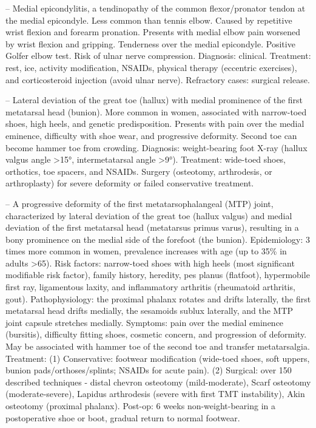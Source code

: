 -- Medial epicondylitis, a tendinopathy of the common flexor/pronator tendon at the medial epicondyle. Less common than tennis elbow. Caused by repetitive wrist flexion and forearm pronation. Presents with medial elbow pain worsened by wrist flexion and gripping. Tenderness over the medial epicondyle. Positive Golfer elbow test. Risk of ulnar nerve compression. Diagnosis: clinical. Treatment: rest, ice, activity modification, NSAIDs, physical therapy (eccentric exercises), and corticosteroid injection (avoid ulnar nerve). Refractory cases: surgical release.

-- Lateral deviation of the great toe (hallux) with medial prominence of the first metatarsal head (bunion). More common in women, associated with narrow-toed shoes, high heels, and genetic predisposition. Presents with pain over the medial eminence, difficulty with shoe wear, and progressive deformity. Second toe can become hammer toe from crowding. Diagnosis: weight-bearing foot X-ray (hallux valgus angle >15°, intermetatarsal angle >9°). Treatment: wide-toed shoes, orthotics, toe spacers, and NSAIDs. Surgery (osteotomy, arthrodesis, or arthroplasty) for severe deformity or failed conservative treatment.

-- A progressive deformity of the first metatarsophalangeal (MTP) joint, characterized by lateral deviation of the great toe (hallux valgus) and medial deviation of the first metatarsal head (metatarsus primus varus), resulting in a bony prominence on the medial side of the forefoot (the bunion). Epidemiology: 3 times more common in women, prevalence increases with age (up to 35\% in adults >65). Risk factors: narrow-toed shoes with high heels (most significant modifiable risk factor), family history, heredity, pes planus (flatfoot), hypermobile first ray, ligamentous laxity, and inflammatory arthritis (rheumatoid arthritis, gout). Pathophysiology: the proximal phalanx rotates and drifts laterally, the first metatarsal head drifts medially, the sesamoids sublux laterally, and the MTP joint capsule stretches medially. Symptoms: pain over the medial eminence (bursitis), difficulty fitting shoes, cosmetic concern, and progression of deformity. May be associated with hammer toe of the second toe and transfer metatarsalgia. Treatment: (1) Conservative: footwear modification (wide-toed shoes, soft uppers, bunion pads/orthoses/splints; NSAIDs for acute pain). (2) Surgical: over 150 described techniques - distal chevron osteotomy (mild-moderate), Scarf osteotomy (moderate-severe), Lapidus arthrodesis (severe with first TMT instability), Akin osteotomy (proximal phalanx). Post-op: 6 weeks non-weight-bearing in a postoperative shoe or boot, gradual return to normal footwear.

